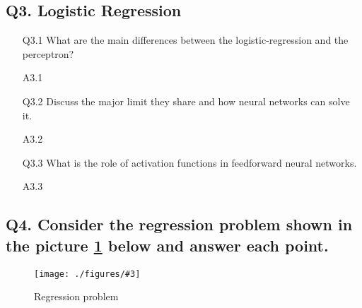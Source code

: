 \documentclass[unicode, 11pt, a4paper]{scrartcl}
\newcommand{\myFigure}[3]{
    \begin{figure}[htbp]
    \centering
    \caption{#1}
    \label{#2}
    \texttt{[image: ./figures/\#3]}
    \end{figure}
}
\begin{document}
\subsection*{Q3. Logistic Regression}
\begin{itemize}
	\item[Q3.1] What are the main differences between the logistic-regression and the perceptron?

	\item[A3.1] ~\\
		

	\item[Q3.2] Discuss the major limit they share and how neural networks can solve it.

	\item[A3.2] ~\\

	\item[Q3.3] What is the role of activation functions in feedforward neural networks.

	\item[A3.3] ~\\
\end{itemize}

\subsection*{
	Q4. Consider the regression problem shown in the picture \ref{fig:ex-q4-regression}
	below and answer each point.
}

\myFigure{Regression problem}{fig:ex-q4-regression}{parabolic.jpg}
\end{document}
